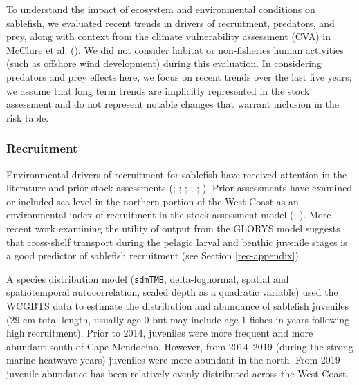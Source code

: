 \documentclass[
  english,
]{article}
\begin{document}
To understand the impact of ecosystem and environmental conditions on
sablefish, we evaluated recent trends in drivers of recruitment,
predators, and prey, along with context from the climate vulnerability
assessment (CVA) in McClure et al.
(). We did not consider habitat or
non-fisheries human activities (such as offshore wind development)
during this evaluation. In considering predators and prey effects here,
we focus on recent trends over the last five years; we assume that long
term trends are implicitly represented in the stock assessment and do
not represent notable changes that warrant inclusion in the risk table.

\subsubsection{Recruitment}\label{recruitment-1}

Environmental drivers of recruitment for sablefish have received
attention in the literature and prior stock assessments
(;
;
;
;
;
). Prior
assessments have examined or included sea-level in the northern portion
of the West Coast as an environmental index of recruitment in the stock
assessment model (; ). More
recent work examining the utility of output from the GLORYS model
suggests that cross-shelf transport during the pelagic larval and
benthic juvenile stages is a good predictor of sablefish recruitment
(see Section \ref{rec-appendix}).

A species distribution model (\texttt{sdmTMB}, delta-lognormal, spatial
and spatiotemporal autocorrelation, scaled depth as a quadratic
variable) used the WCGBTS data to estimate the distribution and
abundance of sablefish juveniles (29 cm total length, usually age-0 but
may include age-1 fishes in years following high recruitment). Prior to
2014, juveniles were more frequent and more abundant south of Cape
Mendocino. However, from 2014--2019 (during the strong marine heatwave
years) juveniles were more abundant in the north. From 2019 juvenile
abundance has been relatively evenly distributed across the West Coast.
\end{document}
